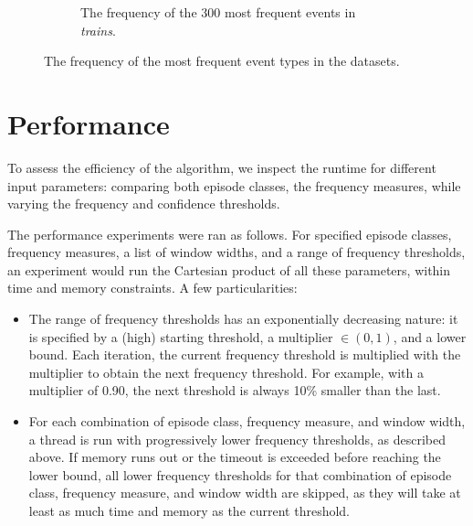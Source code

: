 \begin{figure}
\par\bigskip

\begin{subfigure}[b]{\textwidth}
\centering


\caption{The frequency of the 300 most frequent events in \emph{trains}.}
\label{fig:frequency-plot-trains}
\end{subfigure}

\caption{The frequency of the most frequent event types in the datasets.}
\label{fig:alphabet-frequencies}
\end{figure}


\section{Performance}
\label{sec:performance}

To assess the efficiency of the algorithm, we inspect the runtime for different input parameters: comparing both episode classes, the frequency measures, while varying
the frequency and confidence thresholds.

The performance experiments were ran as follows. For specified episode classes, frequency measures, a list of window widths, and a range of frequency thresholds, an experiment would run the Cartesian product of all these parameters, within time and memory constraints. A few particularities:

\begin{itemize}
\item The range of frequency thresholds has an exponentially decreasing nature: it is specified by a (high) starting threshold, a multiplier $ \in (0, 1) $, and a lower bound. Each iteration, the current frequency threshold is multiplied with the multiplier to obtain the next frequency threshold. For example, with a multiplier of 0.90, the next threshold is always 10\% smaller than the last.
\item For each combination of episode class, frequency measure, and window width, a thread is run with progressively lower frequency thresholds, as described above. If memory runs out or the timeout is exceeded before reaching the lower bound, all lower frequency thresholds for that combination of episode class, frequency measure, and window width are skipped, as they will take at least as much time and memory as the current threshold.
\end{itemize}

